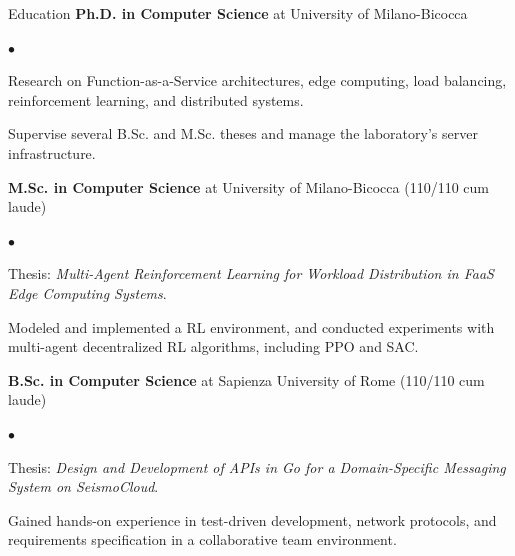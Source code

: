 \vspace{-2.9em}
\begin{rubric}{Education}
	\entry*[2024 -- present] 
	\textbf{Ph.D. in Computer Science} at University of Milano-Bicocca
	
	\begin{list}{\scriptsize$\bullet$}{%
		\setlength{\leftmargin}{1em}
		\setlength{\itemsep}{0em}
		\setlength{\topsep}{0em}
		\setlength{\parsep}{0em}
		\setlength{\partopsep}{0em}
	}
		\item Research on Function-as-a-Service architectures, edge computing, load balancing, reinforcement learning, and distributed systems.
		\item Supervise several B.Sc. and M.Sc. theses and manage the laboratory's server infrastructure.
	\end{list}
	
	\entry*[2021 -- 2024] 
	\textbf{M.Sc. in Computer Science} at University of Milano-Bicocca (110/110 cum laude)
	
	\begin{list}{\scriptsize$\bullet$}{%
		\setlength{\leftmargin}{1em}
		\setlength{\itemsep}{0em}
		\setlength{\topsep}{0em}
		\setlength{\parsep}{0em}
		\setlength{\partopsep}{0em}
	}
		\item Thesis: \emph{Multi-Agent Reinforcement Learning for Workload Distribution in FaaS Edge Computing Systems}.
		\item Modeled and implemented a RL environment, and conducted experiments with multi-agent decentralized RL algorithms, including PPO and SAC.
	\end{list}
	
	\entry*[2017 -- 2021] 
	\textbf{B.Sc. in Computer Science} at Sapienza University of Rome (110/110 cum laude)
	
	\begin{list}{\scriptsize$\bullet$}{%
			\setlength{\leftmargin}{1em}
			\setlength{\itemsep}{0em}
			\setlength{\topsep}{0em}
			\setlength{\parsep}{0em}
			\setlength{\partopsep}{0em}
		}
		\item Thesis: \emph{Design and Development of APIs in Go for a Domain-Specific Messaging System on SeismoCloud}.
		\item Gained hands-on experience in test-driven development, network protocols, and requirements specification in a collaborative team environment.
	\end{list}
\end{rubric}